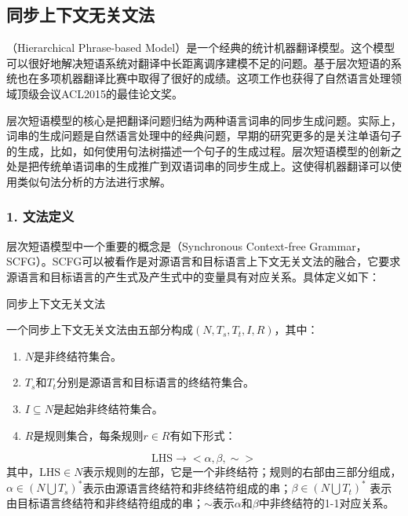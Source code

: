 \subsection{同步上下文无关文法}

（Hierarchical Phrase-based Model）是一个经典的统计机器翻译模型。这个模型可以很好地解决短语系统对翻译中长距离调序建模不足的问题。基于层次短语的系统也在多项机器翻译比赛中取得了很好的成绩。这项工作也获得了自然语言处理领域顶级会议ACL2015的最佳论文奖。

\parinterval 层次短语模型的核心是把翻译问题归结为两种语言词串的同步生成问题。实际上，词串的生成问题是自然语言处理中的经典问题，早期的研究更多的是关注单语句子的生成，比如，如何使用句法树描述一个句子的生成过程。层次短语模型的创新之处是把传统单语词串的生成推广到双语词串的同步生成上。这使得机器翻译可以使用类似句法分析的方法进行求解。


\subsubsection{1. 文法定义}

\parinterval 层次短语模型中一个重要的概念是{\small{}}（Synchronous Context-free Grammar，SCFG）。SCFG可以被看作是对源语言和目标语言上下文无关文法的融合，它要求源语言和目标语言的产生式及产生式中的变量具有对应关系。具体定义如下：

\vspace{0.5em}
\begin{definition} 同步上下文无关文法

{\small
一个同步上下文无关文法由五部分构成$(N, T_s, T_t, I, R)$，其中：
\begin{enumerate}
\item $N$是非终结符集合。
\item $T_s$和$T_t$分别是源语言和目标语言的终结符集合。
\item $I \subseteq N$是起始非终结符集合。
\item $R$是规则集合，每条规则$r \in R$有如下形式：
\end{enumerate}
\vspace{0.3em}
\begin{displaymath}
\textrm{LHS} \to <\alpha, \beta, \sim>
\end{displaymath}
其中，$\textrm{LHS} \in N$表示规则的左部，它是一个非终结符；规则的右部由三部分组成，$\alpha \in (N \bigcup T_s)^{*}$表示由源语言终结符和非终结符组成的串；$\beta \in (N \bigcup T_t)^{*}$ 表示由目标语言终结符和非终结符组成的串；$\sim$表示$\alpha$和$\beta$中非终结符的1-1对应关系。
}
\end{definition}

